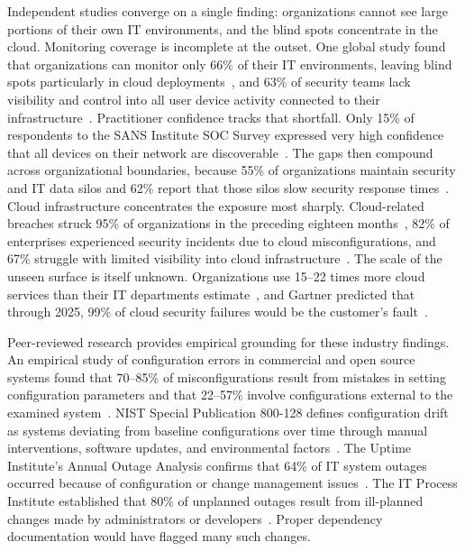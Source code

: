 Independent studies converge on a single finding: organizations cannot see large portions of their own IT environments, and the blind spots concentrate in the cloud. Monitoring coverage is incomplete at the outset. One global study found that organizations can monitor only 66\% of their IT environments, leaving blind spots particularly in cloud deployments~\parencite{IDC_Exabeam_2023}, and 63\% of security teams lack visibility and control into all user device activity connected to their infrastructure~\parencite{Ponemon_Visibility_2023}. Practitioner confidence tracks that shortfall. Only 15\% of respondents to the SANS Institute SOC Survey expressed very high confidence that all devices on their network are discoverable~\parencite{SANS_SOC_Survey_2023}. The gaps then compound across organizational boundaries, because 55\% of organizations maintain security and IT data silos and 62\% report that those silos slow security response times~\parencite{Ivanti_Cybersecurity_2025}. Cloud infrastructure concentrates the exposure most sharply. Cloud-related breaches struck 95\% of organizations in the preceding eighteen months~\parencite{CSA_Cloud_Security_2024}, 82\% of enterprises experienced security incidents due to cloud misconfigurations, and 67\% struggle with limited visibility into cloud infrastructure~\parencite{Check_Point_Cloud_2024}. The scale of the unseen surface is itself unknown. Organizations use 15--22 times more cloud services than their IT departments estimate~\parencite{Cisco_Cloud_Services_2016}, and Gartner predicted that through 2025, 99\% of cloud security failures would be the customer's fault~\parencite{Gartner_Cloud_Misconfiguration_2024}.

Peer-reviewed research provides empirical grounding for these industry findings. An empirical study of configuration errors in commercial and open source systems found that 70--85\% of misconfigurations result from mistakes in setting configuration parameters and that 22--57\% involve configurations external to the examined system~\parencite{Yin_Yuan_Lu_2011}. NIST Special Publication 800-128 defines configuration drift as systems deviating from baseline configurations over time through manual interventions, software updates, and environmental factors~\parencite{NIST_SP_800_128}. The Uptime Institute's Annual Outage Analysis confirms that 64\% of IT system outages occurred because of configuration or change management issues~\parencite{Uptime_Outage_2023}. The IT Process Institute established that 80\% of unplanned outages result from ill-planned changes made by administrators or developers~\parencite{IT_Process_Institute_2004}. Proper dependency documentation would have flagged many such changes.

